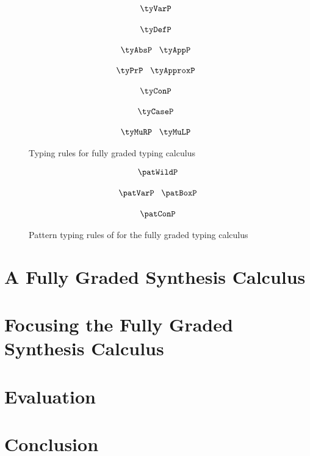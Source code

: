 \begin{figure}[t]
    \hspace{-0.5em}
    \begin{align*}
    \hspace{-0.5em}
    \begin{array}{c}
    \tyVarP
    \\[1.25em]
    \tyDefP
    \\\\
    \tyAbsP
    \;\;\;
    \tyAppP
    \\\\
    \tyPrP
    \;\;\;
    \tyApproxP
    \\\\
    \tyConP
    \\\\
    \tyCaseP
    \\\\
    \tyMuRP
    \;\;\;
    \tyMuLP
    \end{array}
    \end{align*}
    \vspace{-1em}
    \caption{Typing rules for fully graded typing calculus}
    \label{fig:typing}
    \vspace{-0.5em}
\end{figure}

\begin{figure}[t]
    \begin{align*}
    \begin{array}{c}
    \patWildP
    \\[1.25em]
    \patVarP
    \;\;\;
    \patBoxP
    \\[1.25em]
    \patConP
    \end{array}
    \end{align*}
    \vspace{-1.25em}
      \caption{Pattern typing rules of for the fully graded typing calculus}
    \label{fig:pat-typing}
\end{figure}


\section{A Fully Graded Synthesis Calculus}
\label{section:graded-base-synthesis}

\section{Focusing the Fully Graded Synthesis Calculus}
\label{section:graded-base-focusing}

\section{Evaluation}
\label{section:graded-base-evaluation}

\section{Conclusion}
\label{section:graded-base-conclusion}
